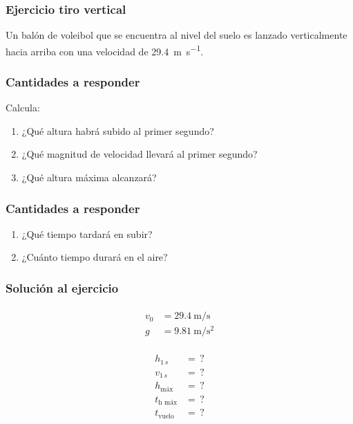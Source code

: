 \documentclass[14pt]{beamer}
\begin{document}
\begin{frame}
\frametitle{Ejercicio tiro vertical}
Un balón de voleibol que se encuentra al nivel del suelo es lanzado verticalmente hacia arriba con una
velocidad de \SI{29.4}{\meter\per\second}.
\end{frame}
\begin{frame}
\frametitle{Cantidades a responder}
\vspace*{-1cm}
Calcula:
\begin{enumerate}[<+->]
\item ¿Qué altura habrá subido al primer segundo?
\item ¿Qué magnitud de velocidad llevará al primer segundo?
\item ¿Qué altura máxima alcanzará?
\seti
\end{enumerate}
\end{frame}
\begin{frame}
\frametitle{Cantidades a responder}
\vspace*{-1cm}
\begin{enumerate}[<+->]
\conti
\item ¿Qué tiempo tardará en subir?
\item ¿Cuánto tiempo durará en el aire?
\end{enumerate}
\end{frame}
\begin{frame}
\frametitle{Solución al ejercicio}
\vspace*{-1cm}
\pause
\begin{minipage}[t]{0.4\linewidth}
\begin{eqnarray*}
\begin{aligned}
v_{0} &= \SI{29.4}{\meter\per\second} \\ 
g &= \SI{9.81}{\meter\per\square\second}
\end{aligned}
\end{eqnarray*}
\end{minipage}
\pause
\hspace{0.2cm}
\begin{minipage}[t]{0.4\linewidth}
\begin{eqnarray*}
\begin{aligned}
h_{1 \, s} &= \, ? \\
v_{1 \, s} &= \, ? \\
h_{\text{máx}} &= \, ? \\
t_{\text{h máx}} &= \, ? \\
t_{\text{vuelo}} &= \, ?
\end{aligned}
\end{eqnarray*}
\end{minipage}
\end{frame}
\end{document}
